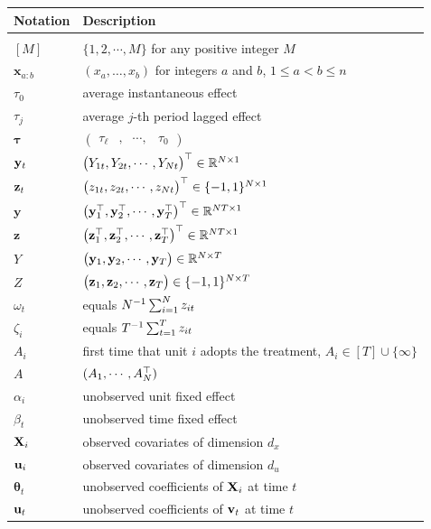 \renewcommand{\theHsection}{A\arabic{section}}


\begin{longtable}{ll}
        	{\bf Notation} & {\bf Description} \\
         \hline \\
         $[M]$ & $\{1, 2, \cdots, M\}$ for any positive integer $M$ \\
        $\bm{x}_{a:b}$ &  $(x_a,\ldots,x_b)$ for integers $a$ and $b$, $1\le a<b\le n$ \\
        $\tau_0$ & average instantaneous effect \\
        $\tau_j$ & average $j$-th period lagged effect \\
        $\bm{\tau}$ & $\begin{pmatrix} \tau_\ell & , & \cdots, & \tau_0   \end{pmatrix}$ \\
        $\mathbf{y}_t$ & $\big(Y_{1t} , Y_{2t} , \cdots , Y_{Nt}\big)^\top \in \mathbb{R}^{N \times 1}$\\
        $\mathbf{z}_t$ & $\big(z_{1t} , z_{2t} , \cdots , z_{Nt}\big)^\top \in \{-1,1\}^{N \times 1}$\\
        $\bm{y}$ & $\big(
	\mathbf{y}_1^\top , \mathbf{y}_2^\top , \cdots , \mathbf{y}_T^\top\big)^\top \in \mathbb{R}^{NT\times 1}$\\
 $\bm{z}$ & $\big(\mathbf{z}_1^\top , \mathbf{z}_2^\top , \cdots , \mathbf{z}_T^\top\big)^\top \in \mathbb{R}^{NT\times 1}$ \\
 $Y$ & $\big(
	\mathbf{y}_1 , \mathbf{y}_2 , \cdots , \mathbf{y}_T\big) \in \mathbb{R}^{N\times T}$  \\ 
 $Z$ & $\big(
	\mathbf{z}_1 , \mathbf{z}_2 , \cdots , \mathbf{z}_T\big) \in \{-1,1\}^{N\times T}$ \\
 $\omega_t$ & equals $N^{-1} \sum_{i = 1}^N z_{it}$ \\
 $\zeta_i$ & equals $T^{-1} \sum_{t = 1}^T z_{it}$ \\
 $A_i$ & first time that unit $i$ adopts the treatment, $A_i \in [T]  \cup \{\infty\}$ \\
 $A$ & $(A_1, \cdots, A_N^\top)$ \\
 $\alpha_i$ & unobserved unit fixed effect \\
 $\beta_t$ & unobserved time fixed effect \\
 $\mathbf{X}_i$ & observed covariates of dimension $d_x$ \\
 $\mathbf{u}_i$ & observed covariates of dimension $d_u$ \\
 $\bm{\theta}_t$ & unobserved coefficients of $\mathbf{X}_i$ at time $t$ \\
 $\mathbf{u}_t$ & unobserved coefficients of $\mathbf{v}_t$ at time $t$ \\

\end{longtable}
